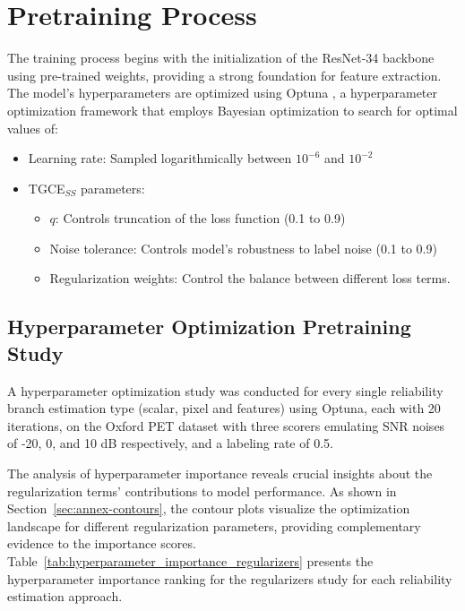 \section{Pretraining Process}

The training process begins with the initialization of the ResNet-34
backbone using pre-trained weights, providing a strong foundation for
feature extraction. The model's hyperparameters are optimized using
Optuna \cite{AkibaEtAl2019}, a hyperparameter optimization framework
that employs Bayesian
optimization to search for optimal values of:

\begin{itemize}
  \item Learning rate: Sampled logarithmically between $10^{-6}$
    and $10^{-2}$
  \item TGCE$_{SS}$ parameters:
    \begin{itemize}
      \item $q$: Controls truncation of the loss function (0.1 to 0.9)
      \item Noise tolerance: Controls model's robustness to label
        noise (0.1 to 0.9)
      \item Regularization weights: Control the balance between
        different loss terms.
    \end{itemize}
\end{itemize}

\subsection{Hyperparameter Optimization Pretraining
Study}\label{sec:pretraining-study}

A hyperparameter optimization study was conducted for every single
reliability branch estimation type (scalar, pixel and features) using Optuna,
each with 20 iterations, on the Oxford PET dataset with three scorers
emulating SNR noises of -20, 0, and 10 dB respectively, and a labeling
rate of 0.5.

The analysis of hyperparameter importance reveals crucial insights
about the regularization terms' contributions to model performance.
As shown in Section~\ref{sec:annex-contours}, the contour plots
visualize the optimization landscape for different regularization
parameters, providing complementary evidence to the importance
scores. Table~\ref{tab:hyperparameter_importance_regularizers} presents the
hyperparameter importance ranking for the regularizers study for each
reliability estimation approach.

